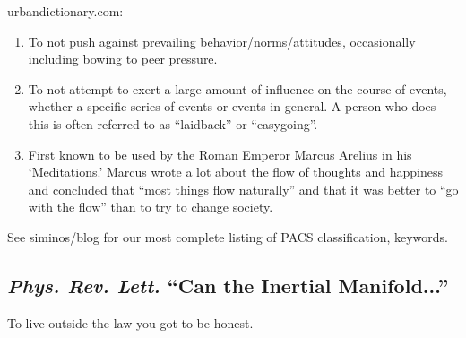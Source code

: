 {urbandictionary.com}:

\begin{enumerate}
   \item To not push against prevailing behavior/norms/attitudes,
   occasionally including bowing to peer pressure.

   \item To not attempt to exert a large amount of influence on the
   course of events, whether a specific series of events or events in
   general. A person who does this is often referred to as ``laidback''
   or ``easygoing''.

   \item First known to be used by the Roman Emperor Marcus Arelius in
   his `Meditations.' Marcus wrote a lot about the flow of
   thoughts and happiness and concluded that ``most things flow
   naturally'' and that it was better to ``go with the flow''
   than to try to change society.
 \end{enumerate}

See siminos/blog for our most complete listing of
PACS classification, keywords.

\subsection{\emph{Phys. Rev. Lett.} ``Can the Inertial Manifold...''}

\begin{bartlett}
To live outside the law   %
you got to be honest.
\end{bartlett}

